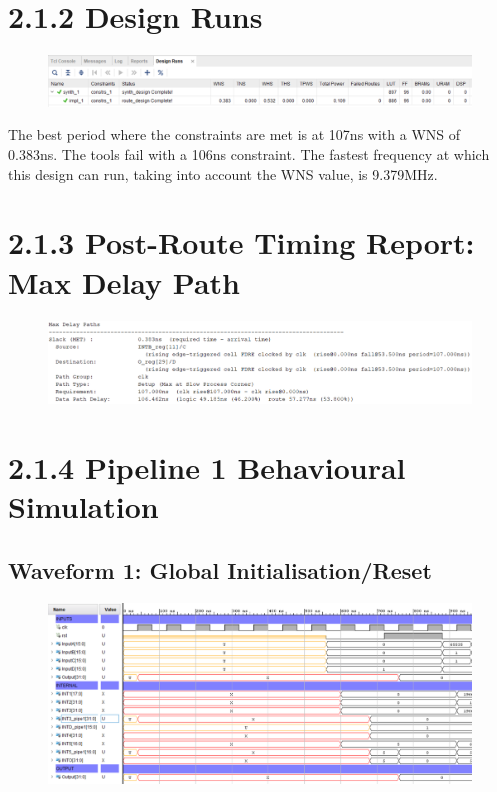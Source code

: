 \documentclass[11pt]{report}
\begin{document}
\section*{2.1.2 Design Runs}
\begin{figure}[H]
    \includegraphics[width=\columnwidth]{Assets/2.1.2_design-runs.png}
\end{figure}
The best period where the constraints are met is at 107ns with a WNS of 0.383ns. The tools fail with a 106ns constraint. The fastest frequency at which this design can run, taking into account the WNS value, is 9.379MHz.


\section*{2.1.3 Post-Route Timing Report: Max Delay Path}
\begin{figure}[H]
    \includegraphics[width=\columnwidth]{Assets/2.1.3_max-delay-path.png}
\end{figure}

\section*{2.1.4 Pipeline 1 Behavioural Simulation}
\subsection*{Waveform 1: Global Initialisation/Reset}
\begin{figure}[H]
    \includegraphics[width=\columnwidth]{Assets/2.1.4_waveform-initial-reset.png}
\end{figure}
\end{document}
